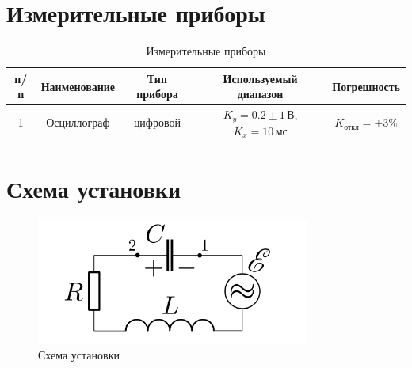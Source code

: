 \section{Измерительные приборы}
\begin{table}[ht]
	\centering
	\begin{tabular}{| c | c | c | c | c |}
		\hline
		\textnumero п/п & Наименование & Тип прибора & Используемый диапазон                                   & Погрешность                   \\
		\hline
		1               & Осциллограф  & цифровой    & \(K_y = 0.2 \pm 1\,\text{В}\), \(K_x = 10\,\text{мс} \) & \( K_\text{откл} = \pm 3\% \) \\
		\hline
	\end{tabular}
	\caption{Измерительные приборы}
\end{table}

\section{Схема установки}
\begin{figure}[H]
	\centering
	\includegraphics[width=0.8\textwidth]{./img/scheme.png}
	\caption{Схема установки}
\end{figure}
